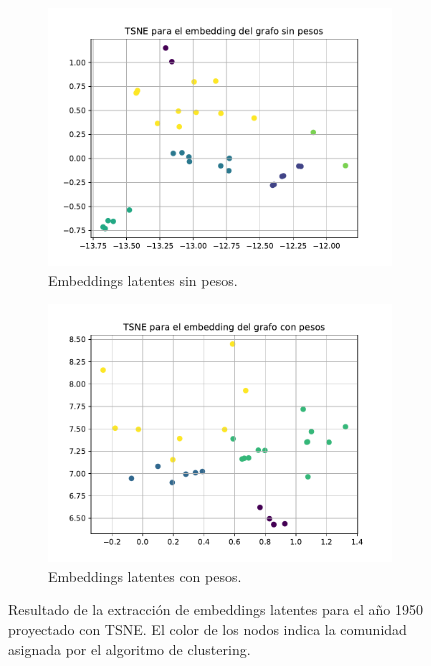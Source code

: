 \documentclass{article}
\begin{document}
\begin{figure}[htb]
    \centering
    \begin{subfigure}{0.49\textwidth}
        \centering
        \includegraphics[width=\linewidth]{images/mapas/clusters_sin_pesos_1950.pdf}
        \caption{Embeddings latentes sin pesos.}
        \label{fig:clusters_1950_sin_pesos}
    \end{subfigure}
    \hfill
    \begin{subfigure}{0.49\textwidth}   
        \centering
        \includegraphics[width=\linewidth]{images/mapas/clusters_con_pesos_1950.pdf}
        \caption{Embeddings latentes con pesos.}
        \label{fig:clusters_1950_con_pesos}
    \end{subfigure}
    \caption{Resultado de la extracción de embeddings latentes para el año 1950 proyectado con TSNE. 
    El color de los nodos indica la comunidad asignada por el algoritmo de clustering.
    }
    \label{fig:clusters_1950}
\end{figure}
\end{document}
